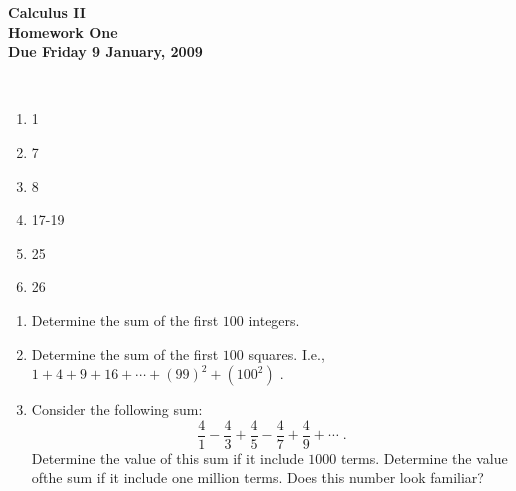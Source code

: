 \documentclass[12pt]{article}
\begin{document}
\pagestyle{empty}
 
\begin{center}
{\large {\bf Calculus II}}\\
\medskip
{\large {\bf Homework One}}\\
\medskip
{ {\bf Due Friday 9 January, 2009}}\\
\end{center}

\hspace{2mm}\\


\begin{enumerate}
\setlength{\itemsep}{-1mm}
  \item 1
  \item 7
  \item 8
  \item 17-19
  \item 25
  \item 26 

\end{enumerate}


\begin{enumerate}
\setlength{\itemsep}{-1mm}
  \item Determine the sum of the first $100$ integers.  
  \item Determine the sum of the first $100$ squares. I.e., $1 + 4 + 9
  +16 + \cdots + (99)^2 + (100^2) \;$.  
  \item Consider the following sum:
\begin{equation}
  \frac{4}{1} - \frac{4}{3} + \frac{4}{5} - \frac{4}{7} + \frac{4}{9}
  + \cdots \;.
\end{equation} 
Determine the value of this sum if it include $1000$ terms.  Determine
  the value ofthe sum if it include one million terms.  Does this
  number look familiar?
\end{enumerate}
\end{document}
